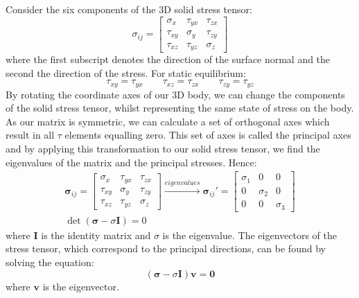 Consider the six components of the 3D solid stress tensor:
\begin{equation}
    \sigma_{ij} = \begin{bmatrix}
        \sigma_x & \tau_{yx} & \tau_{zx}\\
        \tau_{xy} & \sigma_y & \tau_{zy}\\
        \tau_{xz} & \tau_{yz} & \sigma_z
    \end{bmatrix}
\end{equation}
where the first subscript denotes the direction of the surface normal and the second the direction of the stress. For static equilibrium:
\begin{equation}
    \tau_{xy} = \tau_{yx} \qquad \tau_{xz} = \tau_{zx} \qquad \tau_{zy} = \tau_{yz}
\end{equation}
By rotating the coordinate axes of our 3D body, we can change the components of the solid stress tensor, whilst representing the same state of stress on the body. As our matrix is symmetric, we can calculate a set of orthogonal axes which result in all $\tau$ elements equalling zero. This set of axes is called the principal axes and by applying this transformation to our solid stress tensor, we find the eigenvalues of the matrix and the principal stresses. Hence:
\begin{gather}
    \boldsymbol{\sigma}_{ij} = \begin{bmatrix}
        \sigma_x & \tau_{yx} & \tau_{zx}\\
        \tau_{xy} & \sigma_y & \tau_{zy}\\
        \tau_{xz} & \tau_{yz} & \sigma_z
    \end{bmatrix} \xrightarrow{eigenvalues} \boldsymbol{\sigma}_{ij}' = \begin{bmatrix}
        \sigma_1 & 0 & 0\\
        0 & \sigma_2 & 0\\
        0 & 0 & \sigma_3
    \end{bmatrix}\\
    \det(\boldsymbol{\sigma} - \sigma \boldsymbol{I}) = 0
\end{gather}
where $\boldsymbol{I}$ is the identity matrix and $\sigma$ is the eigenvalue. The eigenvectors of the stress tensor, which correspond to the principal directions, can be found by solving the equation:
\begin{equation}
    (\boldsymbol{\sigma} - \sigma \boldsymbol{I})\boldsymbol{v} = \boldsymbol{0}
\end{equation}
where $\boldsymbol{v}$ is the eigenvector. 
